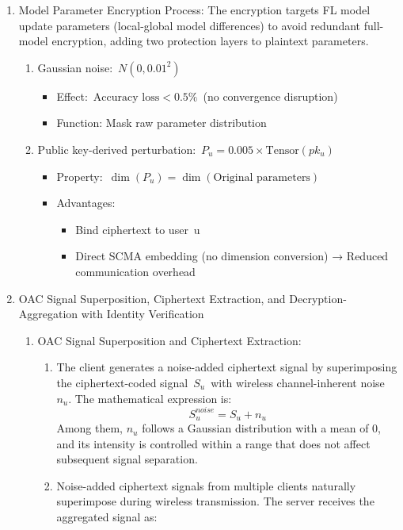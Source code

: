 \documentclass[runningheads]{llncs}
\begin{document}
\begin{enumerate}
\item Model Parameter Encryption Process:
The encryption targets FL model update parameters (local-global model differences) to avoid redundant full-model encryption, adding two protection layers to plaintext parameters.
\begin{enumerate}
\item Gaussian noise: \(N(0, 0.01^2)\)
\begin{itemize}
    \item Effect: \(\text{Accuracy loss} < 0.5\%\) (no convergence disruption)
    \item Function: Mask raw parameter distribution
\end{itemize}
\item Public key-derived perturbation: \(P_u = 0.005 \times \text{Tensor}(pk_u)\)
\begin{itemize}
    \item Property: \(\dim(P_u) = \dim(\text{Original parameters})\)
    \item Advantages:
    \begin{itemize}
        \item Bind ciphertext to user u
        \item Direct SCMA embedding (no dimension conversion) → Reduced communication overhead
    \end{itemize}
\end{itemize}
\end{enumerate}
\item OAC Signal Superposition, Ciphertext Extraction, and Decryption-Aggregation with Identity Verification
\begin{enumerate}
    \item OAC Signal Superposition and Ciphertext Extraction:
    \begin{enumerate}
\item The client generates a noise-added ciphertext signal by superimposing the ciphertext-coded signal \(S_u\) with wireless channel-inherent noise \(n_u\). The mathematical expression is:
\begin{equation*}
    S_u^{noise} = S_u + n_u\tag{11}
\end{equation*}
Among them, \(n_u\) follows a Gaussian distribution with a mean of 0, and its intensity is controlled within a range that does not affect subsequent signal separation.
\item Noise-added ciphertext signals from multiple clients naturally superimpose during wireless transmission. The server receives the aggregated signal as:

\end{enumerate}
\end{enumerate}
\end{enumerate}
\end{document}
